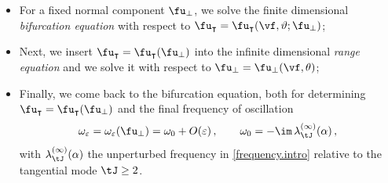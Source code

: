 \documentclass[a4paper,reqno,10pt]{article}
\begin{document}
\begin{itemize}
	\item[1)] For a fixed normal component $\fu_{\perp}$, we solve the finite dimensional
	{\it{bifurcation equation}}
	with respect to $\fu_{\intercal}=\fu_{\intercal}(\vf,\vartheta;\fu_{\perp})$;
	\item[2)] Next, we insert $\fu_{\intercal}= \fu_{\intercal}(\fu_\perp)$ into the infinite dimensional {\it{range equation}}
	and we solve it with respect to $\fu_{\perp}=\fu_{\perp}(\vf,\theta)$;
	\item[3)]
    Finally, we come back to the bifurcation equation, both for determining $\fu_{\intercal}= \fu_{\intercal}(\fu_\perp)$ and the final frequency of oscillation
	\begin{equation}
		\omega_{\varepsilon}
		=\omega_{\varepsilon}(\fu_{\perp})
		=\omega_{0}+O(\varepsilon) \,, 
		\qquad
		\omega_{0}=-\im\,\lambda_{\tJ}^{(\infty)}(\alpha) \,,
	\end{equation}
    with $\lambda_{\tJ}^{(\infty)}(\alpha)$ the unperturbed frequency in \eqref{frequency.intro} relative to the tangential mode $\tJ\geq 2$.
\end{itemize}
\end{document}
